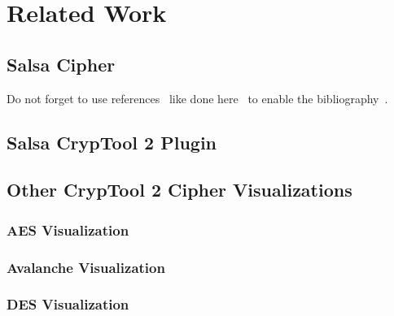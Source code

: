 \chapter{Related Work}
\label{sec:relatedWork}
\section{Salsa Cipher}
\label{sec:salsaCipher}

Do not forget to use references~\cite{Hanser2019energy} like done here~\cite{Hofmann2019dependentVectors} to enable the bibliography~\cite{Jung2017tumble, Sagrista2019GaiaSky, Sdeo2018fullerene, Zheng2019equivalence}.
\blindtext[3]


\section{Salsa CrypTool 2 Plugin}
\label{sec:salsaCT2Plugin}
\blindtext[2]

\section{Other CrypTool 2 Cipher Visualizations}
\label{sec:otherCT2CipherVisualizations}

\subsection{AES Visualization}
\label{sec:aesVisualization}

\blindtext[2]

\blindtext[2]

\subsection{Avalanche Visualization}
\label{sec:avalancheVisualization}

\blindtext[2]

\subsection{DES Visualization}
\label{sec:desVisualization}

\blindtext[2]
